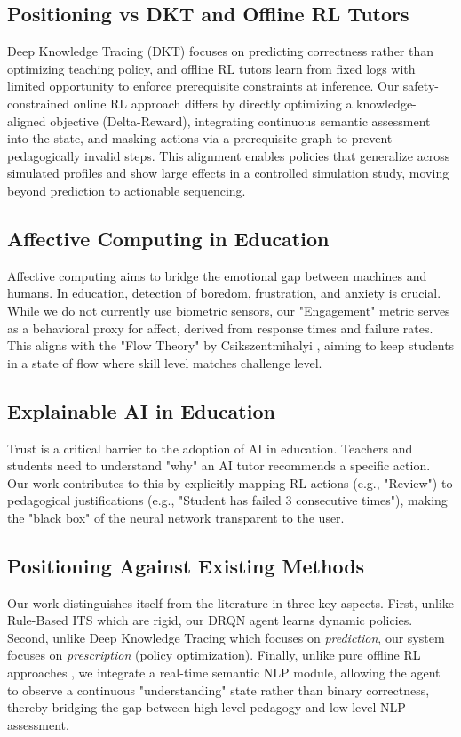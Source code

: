 \documentclass[conference]{IEEEtran}
\begin{document}
\subsection{Positioning vs DKT and Offline RL Tutors}
Deep Knowledge Tracing (DKT) focuses on predicting correctness rather than optimizing teaching policy, and offline RL tutors learn from fixed logs with limited opportunity to enforce prerequisite constraints at inference. Our safety-constrained online RL approach differs by directly optimizing a knowledge-aligned objective (Delta-Reward), integrating continuous semantic assessment into the state, and masking actions via a prerequisite graph to prevent pedagogically invalid steps. This alignment enables policies that generalize across simulated profiles and show large effects in a controlled simulation study, moving beyond prediction to actionable sequencing.

\subsection{Affective Computing in Education}
Affective computing aims to bridge the emotional gap between machines and humans. In education, detection of boredom, frustration, and anxiety is crucial. While we do not currently use biometric sensors, our "Engagement" metric serves as a behavioral proxy for affect, derived from response times and failure rates. This aligns with the "Flow Theory" by Csikszentmihalyi \cite{csikszentmihalyi1990}, aiming to keep students in a state of flow where skill level matches challenge level.

\subsection{Explainable AI in Education}
Trust is a critical barrier to the adoption of AI in education. Teachers and students need to understand "why" an AI tutor recommends a specific action. Our work contributes to this by explicitly mapping RL actions (e.g., "Review") to pedagogical justifications (e.g., "Student has failed 3 consecutive times"), making the "black box" of the neural network transparent to the user.

\subsection{Positioning Against Existing Methods}
Our work distinguishes itself from the literature in three key aspects. First, unlike Rule-Based ITS \cite{koedinger1997} which are rigid, our DRQN agent learns dynamic policies. Second, unlike Deep Knowledge Tracing \cite{piech2015} which focuses on \textit{prediction}, our system focuses on \textit{prescription} (policy optimization). Finally, unlike pure offline RL approaches \cite{doroudi2019}, we integrate a real-time semantic NLP module, allowing the agent to observe a continuous "understanding" state rather than binary correctness, thereby bridging the gap between high-level pedagogy and low-level NLP assessment.
\end{document}
